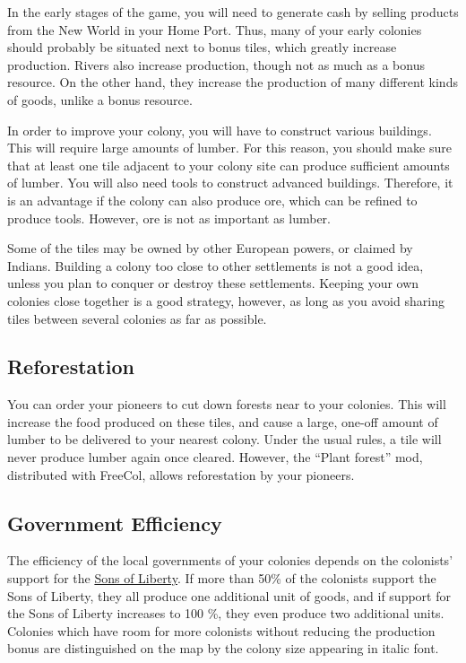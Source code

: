 \documentclass[12pt]{book}
\begin{document}
In the early stages of the game, you will need to generate cash by
selling products from the New World in your Home Port. Thus, many of
your early colonies should probably be situated next to bonus tiles,
which greatly increase production. Rivers also increase production,
though not as much as a bonus resource. On the other hand, they
increase the production of many different kinds of goods, unlike a
bonus resource.

In order to improve your colony, you will have to construct various
buildings. This will require large amounts of lumber. For this reason,
you should make sure that at least one tile adjacent to your colony
site can produce sufficient amounts of lumber. You will also need
tools to construct advanced buildings. Therefore, it is an advantage
if the colony can also produce ore, which can be refined to produce
tools. However, ore is not as important as lumber.

Some of the tiles may be owned by other European powers, or claimed by
Indians. Building a colony too close to other settlements is not a
good idea, unless you plan to conquer or destroy these settlements.
Keeping your own colonies close together is a good strategy, however,
as long as you avoid sharing tiles between several colonies as far as
possible.


\hypertarget{Reforestation}{\subsection{Reforestation}}

You can order your pioneers to cut down forests near to your colonies.
This will increase the food produced on these tiles, and cause a
large, one-off amount of lumber to be delivered to your nearest colony.
Under the usual rules, a tile will never produce lumber again once
cleared. However, the ``Plant forest'' mod, distributed with FreeCol,
allows reforestation by your pioneers.


\hypertarget{Government Efficiency}{\subsection{Government Efficiency}}

The efficiency of the local governments of your colonies depends on
the colonists' support for the \hyperlink{Sons of Liberty}{Sons of
  Liberty}. If more than 50\% of the colonists support the Sons of
Liberty, they all produce one additional unit of goods, and if support
for the Sons of Liberty increases to 100 \%, they even produce two
additional units.  Colonies which have room for more colonists without
reducing the production bonus are distinguished on the map by the
colony size appearing in italic font.
\end{document}
